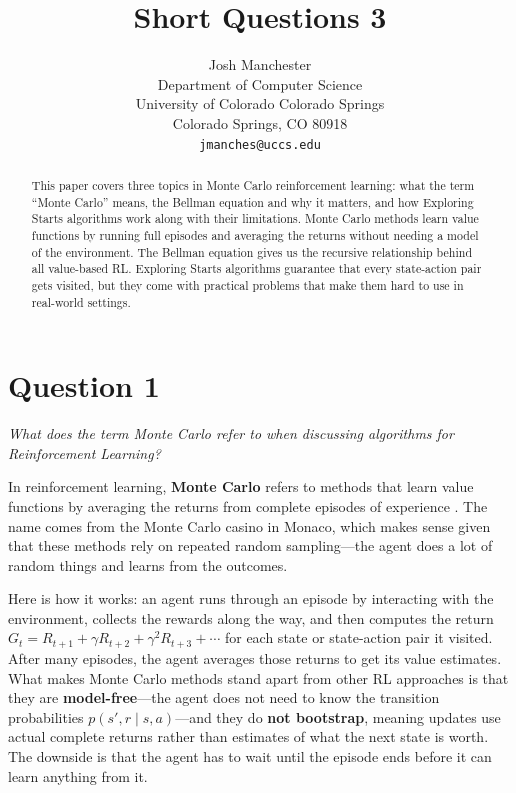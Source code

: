 \documentclass[letterpaper]{article}
\title{Short Questions 3}
\author{
    Josh Manchester\\
    Department of Computer Science\\
    University of Colorado Colorado Springs\\
    Colorado Springs, CO 80918\\
    \texttt{jmanches@uccs.edu}
}
\begin{document}
\maketitle

\begin{abstract}
This paper covers three topics in Monte Carlo reinforcement learning: what the term ``Monte Carlo'' means, the Bellman equation and why it matters, and how Exploring Starts algorithms work along with their limitations. Monte Carlo methods learn value functions by running full episodes and averaging the returns without needing a model of the environment. The Bellman equation gives us the recursive relationship behind all value-based RL. Exploring Starts algorithms guarantee that every state-action pair gets visited, but they come with practical problems that make them hard to use in real-world settings.
\end{abstract}

\section*{Question 1}
\textit{What does the term Monte Carlo refer to when discussing algorithms for Reinforcement Learning?}

\vspace{0.5em}

In reinforcement learning, \textbf{Monte Carlo} refers to methods that learn value functions by averaging the returns from complete episodes of experience \citep{sutton2018reinforcement}. The name comes from the Monte Carlo casino in Monaco, which makes sense given that these methods rely on repeated random sampling---the agent does a lot of random things and learns from the outcomes.

Here is how it works: an agent runs through an episode by interacting with the environment, collects the rewards along the way, and then computes the return $G_t = R_{t+1} + \gamma R_{t+2} + \gamma^2 R_{t+3} + \cdots$ for each state or state-action pair it visited. After many episodes, the agent averages those returns to get its value estimates. What makes Monte Carlo methods stand apart from other RL approaches is that they are \textbf{model-free}---the agent does not need to know the transition probabilities $p(s', r \mid s, a)$---and they do \textbf{not bootstrap}, meaning updates use actual complete returns rather than estimates of what the next state is worth. The downside is that the agent has to wait until the episode ends before it can learn anything from it.
\end{document}
